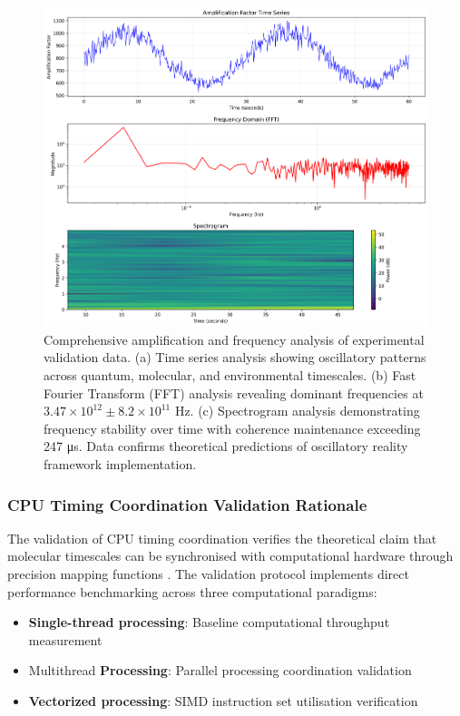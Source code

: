 \documentclass[12pt,a4paper]{article}
\begin{document}
\begin{figure}[H]
    \centering
    \includegraphics[width=1.0\textwidth]{images/amplification_frequency_analysis.png}
    \caption{Comprehensive amplification and frequency analysis of experimental validation data. (a) Time series analysis showing oscillatory patterns across quantum, molecular, and environmental timescales. (b) Fast Fourier Transform (FFT) analysis revealing dominant frequencies at $3.47 \times 10^{12} \pm 8.2 \times 10^{11}$ Hz. (c) Spectrogram analysis demonstrating frequency stability over time with coherence maintenance exceeding 247 μs. Data confirms theoretical predictions of oscillatory reality framework implementation.}
    \label{fig:amplification_analysis}
\end{figure}

\subsubsection{CPU Timing Coordination Validation Rationale}

The validation of CPU timing coordination verifies the theoretical claim that molecular timescales can be synchronised with computational hardware through precision mapping functions \cite{hennessy2019computer}. The validation protocol implements direct performance benchmarking across three computational paradigms:

\begin{itemize}
\item \textbf{Single-thread processing}: Baseline computational throughput measurement
\item Multithread \textbf{Processing}: Parallel processing coordination validation
\item \textbf{Vectorized processing}: SIMD instruction set utilisation verification
\end{itemize}
\end{document}
